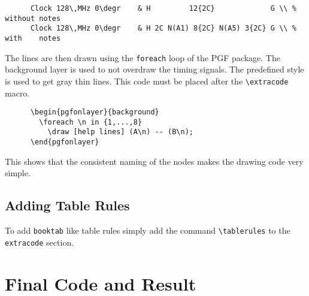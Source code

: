 \documentclass{article}
\def\degr{${}^\circ$}
\begin{document}
    \begin{verbatim}
      Clock 128\,MHz 0\degr    & H         12{2C}             G \\ % without notes
      Clock 128\,MHz 0\degr    & H 2C N(A1) 8{2C} N(A5) 3{2C} G \\ % with    notes
    \end{verbatim}
    
    The lines are then drawn using the \texttt{foreach} loop of the PGF package.
    The background layer is used to not overdraw the timing signals. The predefined 
    style  is used to get gray thin lines.
    This code must be placed after the \verb+\extracode+ macro.
    
    \begin{verbatim}
      \begin{pgfonlayer}{background}
        \foreach \n in {1,...,8}
          \draw [help lines] (A\n) -- (B\n);
      \end{pgfonlayer}
    \end{verbatim}
    
    This shows that the consistent naming of the nodes makes the drawing code very 
    simple.
    
    \subsection{Adding Table Rules}
    To add \texttt{booktab} like table rules simply add the command 
    \verb+\tablerules+ to the \texttt{extracode} section.
    
    \section{Final Code and Result}
    
\end{document}
